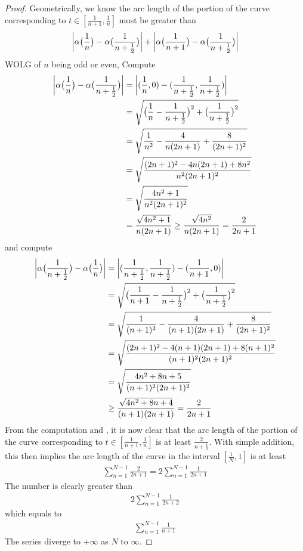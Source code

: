 \documentclass{report}
\begin{document}
\begin{proof}
Geometrically, we know the arc length of the portion of the curve corresponding to $t \in [\frac{1}{n+1},\frac{1}{n}]$ must be greater than 
\begin{align}
\label{19b}
\left|\alpha \big(\frac{1}{n}\big)-\alpha \big(\frac{1}{n+\frac{1}{2}}\big)\right|+\left|\alpha \big(\frac{1}{n+1} \big)-\alpha \big(\frac{1}{n+\frac{1}{2}} \big)\right|
\end{align}
WOLG of $n$ being odd or even, Compute 
\begin{align*}
\left|\alpha \big(\frac{1}{n} \big)-\alpha \big(\frac{1}{n+\frac{1}{2}} \big)\right|&=\left|(\frac{1}{n},0)-(\frac{1}{n+\frac{1}{2}},\frac{1}{n+\frac{1}{2}})\right|\\
&=\sqrt{\big(\frac{1}{n}-\frac{1}{n+\frac{1}{2}} \big)^2 +\big(\frac{1}{n+\frac{1}{2}} \big)^2} \\
&=\sqrt{\frac{1}{n^2}-\frac{4}{n(2n+1)}+\frac{8}{(2n+1)^2}} \\
&=\sqrt{\frac{(2n+1)^2-4n(2n+1)+8n^2}{n^2(2n+1)^2}} \\
&=\sqrt{\frac{4n^2+1}{n^2(2n+1)^2}}\\
&=\frac{\sqrt{4n^2+1} }{n(2n+1)}\geq \frac{\sqrt{4n^2} }{n(2n+1)}=\frac{2}{2n+1}
\end{align*}
and compute 
\begin{align*}
\left|\alpha \big(\frac{1}{n+\frac{1}{2}} \big)-\alpha \big(\frac{1}{n} \big)\right|&=\left|(\frac{1}{n+\frac{1}{2}},\frac{1}{n+\frac{1}{2}})-(\frac{1}{n+1},0)\right|\\
&=\sqrt{\big(\frac{1}{n+1}-\frac{1}{n+\frac{1}{2}} \big)^2 + \big(\frac{1}{n+\frac{1}{2}} \big)^2} \\
&=\sqrt{\frac{1}{(n+1)^2}-\frac{4}{(n+1)(2n+1)}+\frac{8}{(2n+1)^2}}\\
&=\sqrt{\frac{(2n+1)^2 -4(n+1)(2n+1)+8(n+1)^2}{(n+1)^2(2n+1)^2}}\\
&=\sqrt{\frac{4n^2+8n+5}{(n+1)^2(2n+1)^2}}\\
&\geq \frac{\sqrt{4n^2+8n+4} }{(n+1)(2n+1)}=\frac{2}{2n+1}
\end{align*}
From the computation and , it is now clear that the arc length of the portion of the curve corresponding to $ t \in [\frac{1}{n+1},\frac{1}{n}]$ is at least $\frac{2}{n+\frac{1}{2}}$. With simple addition, this then implies the arc length of the curve in the interval $[\frac{1}{N},1]$ is at least 
\begin{align*}
  \sum_{n=1}^{N-1} \frac{2}{2n+1}=2 \sum_{n=1}^{N-1}\frac{1}{2n+1}
\end{align*}
The number is clearly greater than 
\begin{align*}
2 \sum_{n=1}^{N-1}\frac{1}{2n+2}
\end{align*}
which equals to 
\begin{align*}
\sum_{n=1}^{N-1}\frac{1}{n+1}
\end{align*}
The series diverge to $+\infty$ as $N$ to  $\infty$. 
\end{proof}
\end{document}
